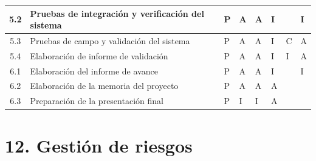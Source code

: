 \documentclass[11pt]{charter}
\begin{document}
\begin{table}[!htpb]
\begin{tabular}{|c|m{4.3cm}|m{1.2cm}|m{1.2cm}|m{1.2cm}|m{1.2cm}|m{1.2cm}|m{1.2cm}|}
    5.2 & Pruebas de integración y verificación del sistema & P & A & A & I & & I \\ \hline
    5.3 & Pruebas de campo y validación del sistema & P & A & A & I & C & A \\ \hline
    5.4 & Elaboración de informe de validación & P & A & A & I & I & A \\ \hline
    6.1 & Elaboración del informe de avance & P & A & A & I & & I \\ \hline
    6.2 & Elaboración de la memoria del proyecto & P & A & A & A & & \\ \hline
    6.3 & Preparación de la presentación final & P & I & I & A & & \\ \hline
  \end{tabular}
\end{table}

\newpage

\section{12. Gestión de riesgos}
\label{sec:riesgos}
\end{document}
